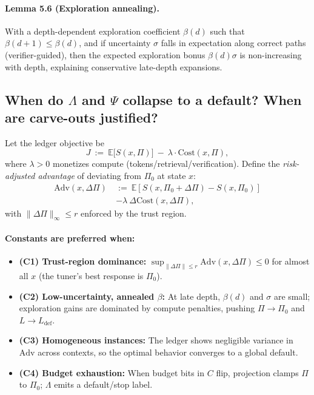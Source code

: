 \documentclass{article}
\theoremstyle{plain}
\theoremstyle{definition}
\theoremstyle{remark}
\begin{document}
\paragraph{Lemma 5.6 (Exploration annealing).}
With a depth-dependent exploration coefficient $\beta(d)$ such that $\beta(d{+}1)\le \beta(d)$, and if uncertainty $\sigma$ falls in expectation along correct paths (verifier-guided), then the expected exploration bonus $\beta(d)\sigma$ is non-increasing with depth, explaining conservative late-depth expansions.

\subsection{When do $\Lambda$ and $\Psi$ collapse to a default? When are carve-outs justified?}

Let the ledger objective be
\[
J \ :=\ \mathbb{E}\big[S(x,\Pi)\big]\ -\ \lambda\cdot \mathrm{Cost}(x,\Pi),
\]
where $\lambda>0$ monetizes compute (tokens/retrieval/verification). 
Define the \emph{risk-adjusted advantage} of deviating from $\Pi_0$ at state $x$:
\begin{align*}
  \mathrm{Adv}(x,\Delta\Pi)\ &:=\ \mathbb{E}\!\left[S(x,\Pi_0+\Delta\Pi)-S(x,\Pi_0)\right] \\
  &-\lambda\ \Delta\mathrm{Cost}(x,\Delta\Pi),
\end{align*}
with $\|\Delta\Pi\|_\infty\le r$ enforced by the trust region.

\paragraph{Constants are preferred when:}
\begin{itemize}
\item \textbf{(C1) Trust-region dominance:} $\sup_{\|\Delta\Pi\|\le r}\mathrm{Adv}(x,\Delta\Pi)\le 0$ for almost all $x$ (the tuner’s best response is $\Pi_0$).
\item \textbf{(C2) Low-uncertainty, annealed $\beta$:} At late depth, $\beta(d)$ and $\sigma$ are small; exploration gains are dominated by compute penalties, pushing $\Pi\!\to\!\Pi_0$ and $L\!\to\!L_{\text{def}}$.
\item \textbf{(C3) Homogeneous instances:} The ledger shows negligible variance in $\mathrm{Adv}$ across contexts, so the optimal behavior converges to a global default.
\item \textbf{(C4) Budget exhaustion:} When budget bits in $C$ flip, projection clamps $\Pi$ to $\Pi_0$; $\Lambda$ emits a default/stop label.
\end{itemize}
\end{document}
